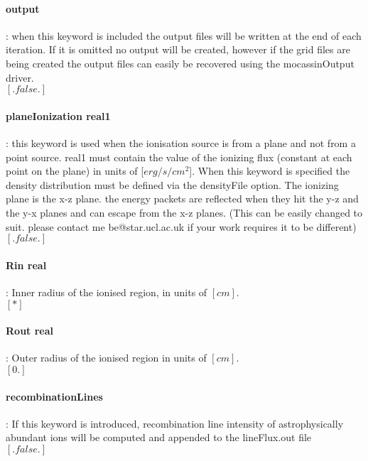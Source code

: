 \documentclass[11pt]{article}
\begin{document}
\paragraph  {  output  }        : when this keyword is included the output files will be written
                    at the end of each iteration. If it is omitted no output will be 
		    created, however if the grid files are being created the output 
                    files can easily be recovered using the mocassinOutput driver. \\
                    $[.false.]$\\
		    
\paragraph  {  planeIonization real1} : this keyword is used when the ionisation source is from a 
                    plane and not from a point source. real1 must contain the value 
		    of the ionizing flux (constant at each point on the plane) in units of 
		    [$erg/s/cm^2$]. When this keyword is specified the density distribution
		    must be defined via the densityFile option. The ionizing plane is the 
		    x-z plane. the energy packets are reflected when they hit the y-z and
		    the y-x planes and can escape from the x-z planes. (This can be easily 
		    changed to suit. please contact me be@star.ucl.ac.uk if your work requires 
		    it to be different)\\
		    $[.false.]$\\

\paragraph  {  Rin real}	    : Inner radius of the ionised region, in units of $[cm]$.\\
		     $[*]$\\

\paragraph  {  Rout real }      : Outer radius of the ionised region in units of $[cm]$. \\
		     $[0.]$\\

\paragraph   { recombinationLines} : If this keyword is introduced, recombination line intensity of 
                     astrophysically abundant ions will be computed and appended to the 
                     lineFlux.out file \\
		     $[.false.]$\\
\end{document}
